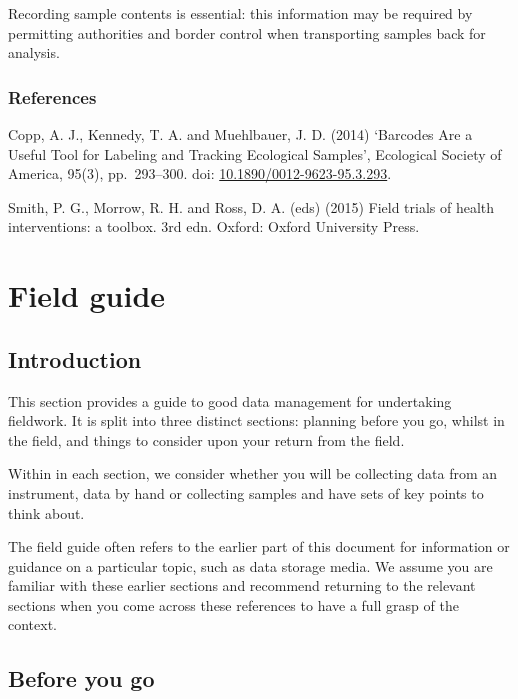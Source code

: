 \documentclass[a4paper,oneside]{report}
\begin{document}
Recording sample contents is essential: this information may be required
by permitting authorities and border control when transporting samples
back for analysis.

\hypertarget{references-6}{%
\section{References}\label{references-6}}

Copp, A. J., Kennedy, T. A. and Muehlbauer, J. D. (2014) `Barcodes Are a
Useful Tool for Labeling and Tracking Ecological Samples', Ecological
Society of America, 95(3), pp.~293--300. doi:
\href{https://doi.org/10.1890/0012-9623-95.3.293}{10.1890/0012-9623-95.3.293}.

Smith, P. G., Morrow, R. H. and Ross, D. A. (eds) (2015) Field trials of
health interventions: a toolbox. 3rd edn. Oxford: Oxford University
Press.

\hypertarget{field-guide}{%
\part{Field guide}\label{field-guide}}

\hypertarget{introduction-1}{%
\chapter{Introduction}\label{introduction-1}}

This section provides a guide to good data management for undertaking
fieldwork. It is split into three distinct sections: planning before you
go, whilst in the field, and things to consider upon your return from
the field.

Within in each section, we consider whether you will be collecting data
from an instrument, data by hand or collecting samples and have sets of
key points to think about.

The field guide often refers to the earlier part of this document for
information or guidance on a particular topic, such as data storage
media. We assume you are familiar with these earlier sections and
recommend returning to the relevant sections when you come across these
references to have a full grasp of the context.

\hypertarget{before-you-go}{%
\chapter{Before you go}\label{before-you-go}}
\end{document}
